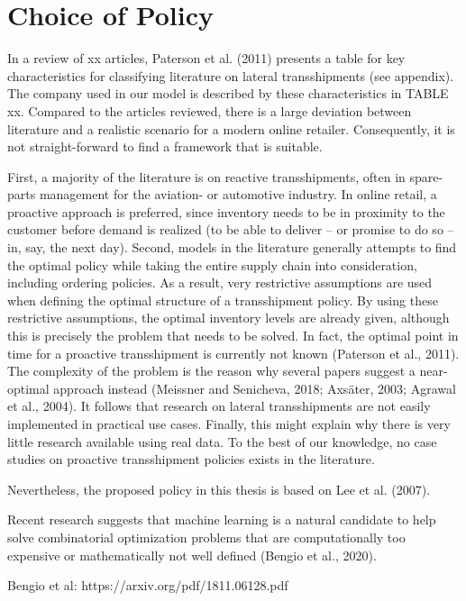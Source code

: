\documentclass[../../main.tex]{subfiles}
\begin{document}

\section{Choice of Policy}

In a review of xx articles, Paterson et al. (2011) presents a table for key characteristics for classifying literature on lateral transshipments (see appendix). The company used in our model is described by these characteristics in TABLE xx. Compared to the articles reviewed, there is a large deviation between literature and a realistic scenario for a modern online retailer. Consequently, it is not straight-forward to find a framework that is suitable.

First, a majority of the literature is on reactive transshipments, often in spare-parts management for the aviation- or automotive industry. In online retail, a proactive approach is preferred, since inventory needs to be in proximity to the customer before demand is realized (to be able to deliver – or promise to do so – in, say, the next day). Second, models in the literature generally attempts to find the optimal policy while taking the entire supply chain into consideration, including ordering policies. As a result, very restrictive assumptions are used when defining the optimal structure of a transshipment policy. By using these restrictive assumptions, the optimal inventory levels are already given, although this is precisely the problem that needs to be solved. In fact, the optimal point in time for a proactive transshipment is currently not known (Paterson et al., 2011). The complexity of the problem is the reason why several papers suggest a near-optimal approach instead (Meissner and Senicheva, 2018; Axsäter, 2003; Agrawal et al., 2004). It follows that research on lateral transshipments are not easily implemented in practical use cases. Finally, this might explain why there is very little research available using real data. To the best of our knowledge, no case studies on proactive transshipment policies exists in the literature.

Nevertheless, the proposed policy in this thesis is based on Lee et al. (2007). 
 
Recent research suggests that machine learning is a natural candidate to help solve combinatorial optimization problems that are computationally too expensive or mathematically not well defined (Bengio et al., 2020). 

Bengio et al: https://arxiv.org/pdf/1811.06128.pdf
\end{document}
